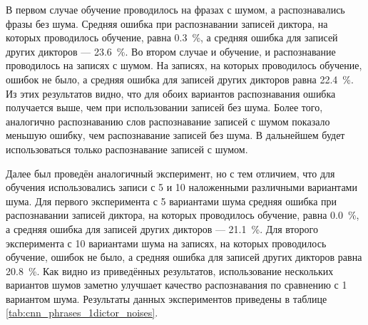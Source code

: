 В первом случае обучение проводилось на фразах с шумом, а распознавались фразы без шума.
Средняя ошибка при распознавании записей диктора, на которых проводилось обучение, равна 0.3~\%, а средняя ошибка для записей других дикторов --- 23.6~\%.
Во втором случае и обучение, и распознавание проводилось на записях с шумом.
На записях, на которых проводилось обучение, ошибок не было, а средняя ошибка для записей других дикторов равна 22.4~\%.
Из этих результатов видно, что для обоих вариантов распознавания ошибка получается выше, чем при использовании записей без шума.
Более того, аналогично распознаванию слов распознавание записей с шумом показало меньшую ошибку, чем распознавание записей без шума.
В дальнейшем будет использоваться только распознавание записей с шумом.

Далее был проведён аналогичный эксперимент, но с тем отличием, что для обучения использовались записи с 5 и 10 наложенными различными вариантами шума.
Для первого эксперимента с 5 вариантами шума средняя ошибка при распознавании записей диктора, на которых проводилось обучение, равна 0.0~\%, а средняя ошибка для записей других дикторов --- 21.1~\%.
Для второго эксперимента с 10 вариантами шума на записях, на которых проводилось обучение, ошибок не было, а средняя ошибка для записей других дикторов равна 20.8~\%.
Как видно из приведённых результатов, использование нескольких вариантов шумов заметно улучшает качество распознавания по сравнению с 1 вариантом шума.
Результаты данных экспериментов приведены в таблице \ref{tab:cnn_phrases_1dictor_noises}.


